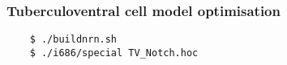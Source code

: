 \newpage
%



\subsubsection[TV cell model]{Tuberculoventral cell model optimisation    \label{sec:APDX:tuberc-cell-model}}

\begin{verbatim}
    $ ./buildnrn.sh
    $ ./i686/special TV_Notch.hoc
\end{verbatim}


